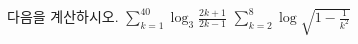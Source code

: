 다음을 계산하시오.
 $\displaystyle\sum_{k=1}^{40}\log_3\frac{2k+1}{2k-1}$
 $\displaystyle\sum_{k=2}^{8}\log\sqrt{1-\frac{1}{k^2}}$

